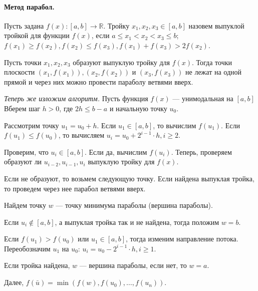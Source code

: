 
\paragraph{Метод парабол.} 
\begin{definition}
	Пусть задана $f(x): [a, b] \to \mathbb{R}$. Тройку $x_1, x_2, x_3 \in [a, b]$ назовем выпуклой тройкой для функции $f(x)$, если $a \leqslant x_1 < x_2 < x_3 \leqslant b$; $f(x_1) \geqslant f(x_2), f(x_2) \leqslant f(x_3), f(x_1) + f(x_3) > 2 f(x_2)$. 
\end{definition}

\begin{utv}
	Пусть точки $x_1, x_2, x_3$ образуют выпуклую тройку для $f(x)$. Тогда точки плоскости $(x_1, f(x_1)), (x_2, f(x_2))$ и $(x_3, f(x_3))$ не лежат на одной прямой и через них можно провести параболу ветвями вверх. 
\end{utv}

\textit{Теперь же изложим алгоритм.} Пусть функция $f(x)$ --- унимодальная на $[a, b]$ Вберем шаг $h > 0$, где $2 h \leqslant b - a$ и начальную точку $u_0$.

Рассмотрим точку $u_1 = u_0 + h$. Если $u_1 \in [a, b]$, то вычислим $f(u_1)$. Если $f(u_1) \leqslant f(u_0)$, то вычисляем $u_i = u_0 + 2^{i - 1} \cdot h, i \geqslant 2$. 

Проверим, что $u_i \in [a, b]$. Если да, вычислим $f(u_i)$. Теперь, проверяем образуют ли $u_{i - 2}, u_{i - 1}, u_i$ выпуклую тройку для $f(x)$.

Если не образуют, то возьмем следующую точку. Если найдена выпуклая тройка, то проведем через нее парабол ветвями вверх. 

Найдем точку $w$ --- точку минимума параболы (вершина параболы). 

Если $u_i \not \in [a, b]$, а выпуклая тройка так и не найдена, тогда положим $w = b$. 

Если $f(u_1) > f(u_0)$ или $u_1 \in [a, b]$, тогда изменим направление потока. Переобозначим $u_1$ на $u_0$: $u_i = u_0 - 2^{i - 1} \cdot h, i \geqslant 1$.

Если тройка найдена, $w$ --- вершина параболы, если нет, то $w = a$. 

Далее, $f(\bar{u}) = \min(f(w), f(u_0), \dotsc, f(u_n))$.